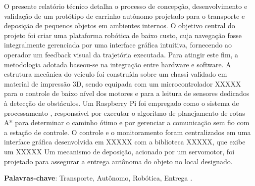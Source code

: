 \begin{resumo}

O presente relatório técnico detalha o processo de concepção, desenvolvimento e validação de um protótipo de carrinho autônomo projetado para o transporte e deposição de pequenos objetos em ambientes internos. O objetivo central do projeto foi criar uma plataforma robótica de baixo custo, cuja navegação fosse integralmente gerenciada por uma interface gráfica intuitiva, fornecendo ao operador um feedback visual da trajetória executada. Para atingir este fim, a metodologia adotada baseou-se na integração entre hardware e software. A estrutura mecânica do veículo foi construída sobre um chassi validado em material de impressão 3D, sendo equipada com um microcontrolador XXXXX para o controle de baixo nível dos motores e para a leitura de sensores  dedicados à detecção de obstáculos. Um Raspberry Pi foi empregado como o sistema de processamento , responsável por executar o algoritmo de planejamento de rotas A* para determinar o caminho ótimo e por gerenciar a comunicação sem fio com a estação de controle. O controle e o monitoramento foram centralizados em uma interface gráfica desenvolvida em XXXXX com a biblioteca XXXXX, que exibe um XXXXX Um mecanismo de deposição, acionado por um servomotor, foi projetado para assegurar a entrega autônoma do objeto no local designado. 

\vspace{\onelineskip}
    
\noindent
\textbf{Palavras-chave}: Transporte, Autônomo, Robótica, Entrega .
\end{resumo}